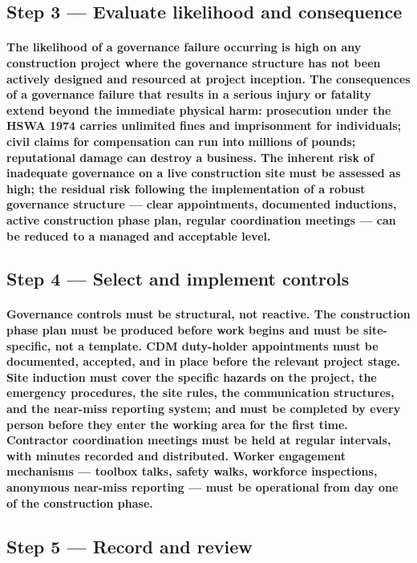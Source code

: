 \subsection{Step 3 --- Evaluate likelihood and consequence}
\paragraph{The likelihood of a governance failure occurring is high on any construction project where the governance structure has not been actively designed and resourced at project inception. The consequences of a governance failure that results in a serious injury or fatality extend beyond the immediate physical harm: prosecution under the HSWA 1974 carries unlimited fines and imprisonment for individuals; civil claims for compensation can run into millions of pounds; reputational damage can destroy a business. The inherent risk of inadequate governance on a live construction site must be assessed as high; the residual risk following the implementation of a robust governance structure --- clear appointments, documented inductions, active construction phase plan, regular coordination meetings --- can be reduced to a managed and acceptable level.}

\subsection{Step 4 --- Select and implement controls}
\paragraph{Governance controls must be structural, not reactive. The construction phase plan must be produced before work begins and must be site-specific, not a template. CDM duty-holder appointments must be documented, accepted, and in place before the relevant project stage. Site induction must cover the specific hazards on the project, the emergency procedures, the site rules, the communication structures, and the near-miss reporting system; and must be completed by every person before they enter the working area for the first time. Contractor coordination meetings must be held at regular intervals, with minutes recorded and distributed. Worker engagement mechanisms --- toolbox talks, safety walks, workforce inspections, anonymous near-miss reporting --- must be operational from day one of the construction phase.}

\subsection{Step 5 --- Record and review}
